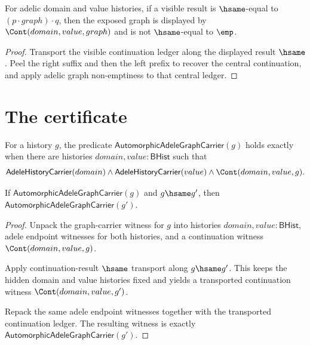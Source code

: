 \begin{theorem}
\label{thm:automorphic-adele-graph-visible-result-context-factorizes}
For adelic domain and value histories, if a visible result is
$\hsame$-equal to $(p\cdot graph)\cdot q$, then the exposed graph is displayed
by $\Cont(domain,value,graph)$ and is not $\hsame$-equal to $\emp$.
\end{theorem}
\begin{proof}
Transport the visible continuation ledger along the displayed result
$\hsame$. Peel the right suffix and then the left prefix to recover the central
continuation, and apply adelic graph non-emptiness to that central ledger.
\end{proof}

\section{The certificate}
\label{sec:automorphic-certificate}

\begin{definition}
\label{def:automorphic-adele-graph-carrier}
For a history $g$, the predicate
$\mathsf{AutomorphicAdeleGraphCarrier}(g)$ holds exactly when there are
histories $domain,value:\mathsf{BHist}$ such that
$$
\mathsf{AdeleHistoryCarrier}(domain)\land
\mathsf{AdeleHistoryCarrier}(value)\land
\Cont(domain,value,g).
$$
\end{definition}

\begin{theorem}
\label{thm:automorphic-adele-graph-carrier-hsame-transport}
If $\mathsf{AutomorphicAdeleGraphCarrier}(g)$ and $g\hsame g'$, then
$\mathsf{AutomorphicAdeleGraphCarrier}(g')$.
\end{theorem}
\begin{proof}
Unpack the graph-carrier witness for $g$ into histories
$domain,value:\mathsf{BHist}$, adele endpoint witnesses for both histories, and
a continuation witness $\Cont(domain,value,g)$.

Apply continuation-result $\hsame$ transport along $g\hsame g'$. This keeps the
hidden domain and value histories fixed and yields a transported continuation
witness $\Cont(domain,value,g')$.

Repack the same adele endpoint witnesses together with the transported
continuation ledger. The resulting witness is exactly
$\mathsf{AutomorphicAdeleGraphCarrier}(g')$.
\end{proof}

